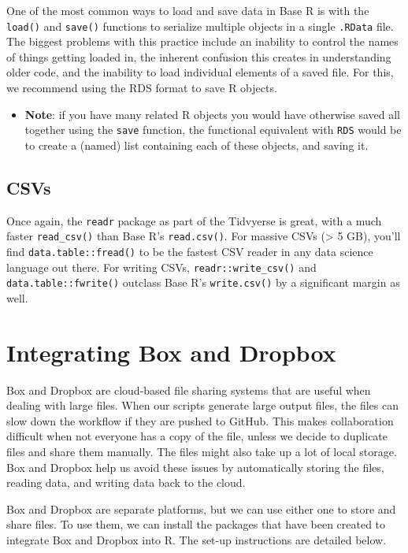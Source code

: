 \documentclass[]{book}
\providecommand{\tightlist}{%
  \setlength{\itemsep}{0pt}\setlength{\parskip}{0pt}}
\begin{document}
One of the most common ways to load and save data in Base R is with the
\texttt{load()} and \texttt{save()} functions to serialize multiple
objects in a single \texttt{.RData} file. The biggest problems with this
practice include an inability to control the names of things getting
loaded in, the inherent confusion this creates in understanding older
code, and the inability to load individual elements of a saved file. For
this, we recommend using the RDS format to save R objects.

\begin{itemize}
\tightlist
\item
  \textbf{Note}: if you have many related R objects you would have
  otherwise saved all together using the \texttt{save} function, the
  functional equivalent with \texttt{RDS} would be to create a (named)
  list containing each of these objects, and saving it.
\end{itemize}

\subsection{CSVs}\label{csvs}

Once again, the \texttt{readr} package as part of the Tidvyerse is
great, with a much faster \texttt{read\_csv()} than Base R's
\texttt{read.csv()}. For massive CSVs (\textgreater{} 5 GB), you'll find
\texttt{data.table::fread()} to be the fastest CSV reader in any data
science language out there. For writing CSVs,
\texttt{readr::write\_csv()} and \texttt{data.table::fwrite()} outclass
Base R's \texttt{write.csv()} by a significant margin as well.

\section{Integrating Box and Dropbox}\label{integrating-box-and-dropbox}

Box and Dropbox are cloud-based file sharing systems that are useful
when dealing with large files. When our scripts generate large output
files, the files can slow down the workflow if they are pushed to
GitHub. This makes collaboration difficult when not everyone has a copy
of the file, unless we decide to duplicate files and share them
manually. The files might also take up a lot of local storage. Box and
Dropbox help us avoid these issues by automatically storing the files,
reading data, and writing data back to the cloud.

Box and Dropbox are separate platforms, but we can use either one to
store and share files. To use them, we can install the packages that
have been created to integrate Box and Dropbox into R. The set-up
instructions are detailed below.
\end{document}

